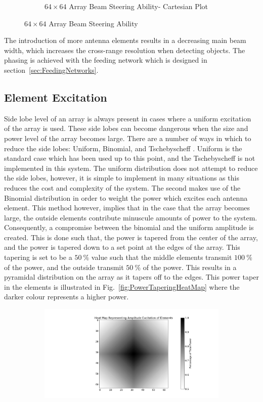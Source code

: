 \documentclass[11pt]{witseiepaper}
\begin{document}
\begin{bibunit}[witseie]
\begin{figure}[htb]
\begin{subfigure}{.5\textwidth}
            \caption{$64 \times 64$ Array Beam Steering Ability- Cartesian Plot}
                \label{fig:SteeringBig-Cartesian}
            \end{subfigure}
\caption{$64 \times 64$ Array Beam Steering Ability}
\label{fig:SteeringBig}
\end{figure}
The introduction of more antenna elements results in a decreasing main beam width, which increases the cross-range resolution when detecting objects\cite[p.~14,28,469]{radarHandbook}.
The phasing is achieved with the feeding network which is designed in section~\ref{sec:FeedingNetworks}.

\subsection{Element Excitation} \label{sec:ElementExcitation}
Side lobe level of an array is always present in cases where a uniform excitation of the array is used. These side lobes can become dangerous when the size and power level of the array becomes large.
There are a number of ways in which to reduce the side lobes: Uniform, Binomial, and Tschebyscheff \cite[p.~324-325]{Balanis}. Uniform is the standard case which has been used up to this point, and the Tschebyscheff is not implemented in this system. The uniform distribution does not attempt to reduce the side lobes, however, it is simple to implement in many situations as this reduces the cost and complexity of the system. The second makes use of the Binomial distribution in order to weight the power which excites each antenna element.
This method however, implies that in the case that the array becomes large, the outside elements contribute minuscule amounts of power to the system.
Consequently, a compromise between the binomial and the uniform amplitude is created.
This is done such that, the power is tapered from the center of the array, and the power is tapered down to a set point at the edges of the array. This tapering is set to be a $50~\%$ value such that the middle elements transmit $100~\%$ of the power, and the outside transmit $50~\%$ of the power. This results in a pyramidal distribution on the array as it tapers off to the edges.
This power taper in the elements is illustrated in Fig.~\ref{fig:PowerTaperingHeatMap} where the darker colour represents a higher power.
\begin{figure}[htb]
    \centering
    \begin{subfigure}{.5\textwidth}
        \centering
            \includegraphics[width=0.9\linewidth]{PowerTapering.pdf}

\end{subfigure}
\end{figure}
\end{bibunit}
\end{document}
